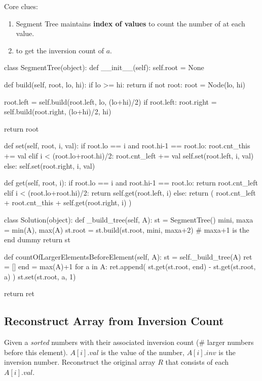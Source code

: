 Core clues:
\begin{enumerate}
\item Segment Tree maintains \textbf{index of values} to count the number of at each value.
\item {} to get the inversion count of $a$.
\end{enumerate}
\begin{python}
class SegmentTree(object):
  def __init__(self):
    self.root = None

  def build(self, root, lo, hi):
    if lo >= hi: return
    if not root: root = Node(lo, hi)

    root.left = self.build(root.left, lo, (lo+hi)/2)
    if root.left: 
      root.right = self.build(root.right, (lo+hi)/2, hi)

    return root

  def set(self, root, i, val):
    if root.lo == i and root.hi-1 == root.lo:
      root.cnt_this += val
    elif i < (root.lo+root.hi)/2:
      root.cnt_left += val
      self.set(root.left, i, val)
    else:
      self.set(root.right, i, val)

  def get(self, root, i):
    if root.lo == i and root.hi-1 == root.lo:
      return root.cnt_left
    elif i < (root.lo+root.hi)/2:
      return self.get(root.left, i)
    else:
      return (
          root.cnt_left + root.cnt_this +
          self.get(root.right, i)
      )


class Solution(object):
  def _build_tree(self, A):
    st = SegmentTree()
    mini, maxa = min(A), max(A)
    st.root = st.build(st.root, mini, maxa+2)  
    # maxa+1 is the end dummy
    return st

  def countOfLargerElementsBeforeElement(self, A):
    st = self._build_tree(A)
    ret = []
    end = max(A)+1
    for a in A:
      ret.append(
          st.get(st.root, end) - st.get(st.root, a)
      )
      st.set(st.root, a, 1)

    return ret
\end{python}

\subsection{Reconstruct Array from Inversion Count}\label{inversionReconstruct}
Given a \textit{sorted} numbers with their associated inversion count (\# larger numbers before this element). $A[i].val$ is the value of the number, $A[i].inv$ is the inversion number. Reconstruct the original array $R$ that consists of each $A[i].val$.

